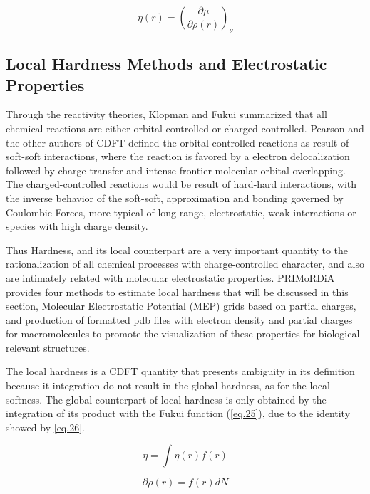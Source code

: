 \documentclass[a4paper,11pt]{refart}
\begin{document}
\begin{equation}
\eta(r) = \left( \frac{\partial \mu}{\partial \rho(r) } \right)_\nu
\label{eq.24}
\end{equation}

\subsection{Local Hardness Methods and Electrostatic Properties}

Through the reactivity theories, Klopman and Fukui summarized that all chemical reactions are either orbital-controlled or charged-controlled. Pearson and the other authors of CDFT defined the orbital-controlled reactions as result of soft-soft interactions, where the reaction is favored by a electron delocalization followed by charge transfer and intense frontier molecular orbital overlapping. The charged-controlled reactions would be result of hard-hard interactions, with the inverse behavior of the soft-soft, approximation and bonding governed by Coulombic Forces, more typical of long range, electrostatic, weak interactions or species with high charge density. 

Thus Hardness, and its local counterpart are a very important quantity to the rationalization of all chemical processes with charge-controlled character, and also are intimately related with molecular electrostatic properties. PRIMoRDiA provides four methods to estimate local hardness that will be discussed in this section, Molecular Electrostatic Potential (MEP) grids based on partial charges, and production of formatted pdb files with electron density and partial charges for macromolecules to promote the visualization of these properties for biological relevant structures.

The local hardness is a CDFT quantity that presents ambiguity in its definition because it integration do not result in the global hardness, as for the local softness. The global counterpart of local hardness is only obtained by the integration of its product with the Fukui function (\autoref{eq.25}), due to the identity showed by \autoref{eq.26}. 

\begin{equation}
\eta = \int \eta(r) f(r)
\label{eq.25}
\end{equation}

\begin{equation}
\partial \rho(r) = f(r)dN
\label{eq.26}
\end{equation}
\end{document}
